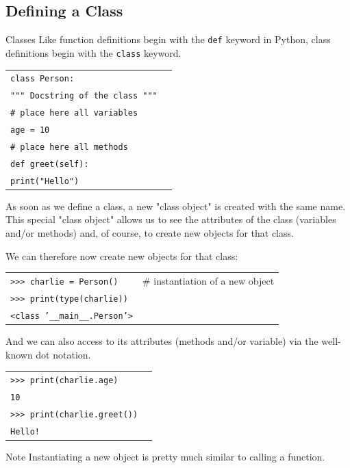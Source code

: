 \documentclass[t,handout,9pt]{beamer}
\begin{document}
\subsection{Defining a Class}
\begin{frame}{Classes}
\vfill
Like function definitions begin with the \texttt{def} keyword in Python, class definitions begin with the \texttt{class} keyword.
\begin{table}[]
\begin{flushleft}
\begin{tabular}{ll}
\texttt{class Person:} &  \\
\texttt{\qquad """ Docstring of the class """} &  \\
\texttt{\qquad \# place here all variables} &  \\
\texttt{\qquad age = 10} &  \\
\texttt{\qquad \# place here all methods} &  \\
\texttt{\qquad def greet(self):} &  \\
\texttt{\qquad\qquad print("Hello")} &  \\
\end{tabular}
\end{flushleft}
\end{table}
\vfill
As soon as we define a class, a new "class object" is created with the same name.\\
This special "class object" allows us to see the attributes of the class (variables and/or methods) and, of course, to create new objects for that class.
\vfill
\end{frame}
%
\begin{frame}
\vfill
We can therefore now create new objects for that class:
\begin{table}[]
\begin{flushleft}
\begin{tabular}{ll}
\texttt{>{}>{}> charlie = Person()} &  \# instantiation of a new object\\
\texttt{>{}>{}> print(type(charlie))} &  \\
\texttt{<class '\_\_main\_\_.Person'>} &  \\
\end{tabular}
\end{flushleft}
\end{table}
\vfill
And we can also access to its attributes (methods and/or variable) via the well-known dot notation.
\begin{table}[]
\begin{flushleft}
\begin{tabular}{ll}
\texttt{>{}>{}> print(charlie.age)} & \\
\texttt{10} &  \\
\texttt{>{}>{}> print(charlie.greet())} &  \\
\texttt{Hello!} &  \\
\end{tabular}
\end{flushleft}
\end{table}
\vfill
\begin{block}{Note}
Instantiating a new object is pretty much similar to calling a function.
\end{block}
\vfill
\end{frame}
%
\end{document}
